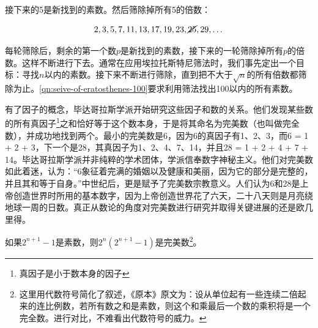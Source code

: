 \documentclass[b5paper]{ctexart}
\begin{document}
接下来的5是新找到的素数。然后筛除掉所有5的倍数：

\[2, 3, 5, 7, 11, 13, 17, 19, 23, \cancel{25}, 29, \dotsc\]

每轮筛除后，剩余的第一个数$p$是新找到的素数，接下来的一轮筛除掉所有$p$的倍数。这样不断进行下去。通常在应用埃拉托斯特尼筛法时，我们事先定出一个目标：寻找$n$以内的素数。接下来不断进行筛除，直到把不大于$\sqrt{n}$的所有倍数都筛除为止。\cref{qn:seive-of-eratosthenes-100}要求利用筛法找出100以内的所有素数。

 
有了因子的概念，毕达哥拉斯学派开始研究这些因子和数的关系。他们发现某些数的所有真因子\footnote{真因子是小于数本身的因子}之和恰好等于这个数本身，于是将其命名为完美数（也叫做完全数），并成功地找到两个。最小的完美数是6，因为6的真因子有1、2、3，而6 = 1 + 2 + 3，下一个是28，其真因子为1、2、4、7、14，并且28 = 1 + 2 + 4 + 7 + 14。毕达哥拉斯学派并非纯粹的学术团体，学派信奉数字神秘主义。他们对完美数如此着迷，认为：“6象征着完满的婚姻以及健康和美丽，因为它的部分是完整的，并且其和等于自身。”中世纪后，更是赋予了完美数宗教意义。人们认为6和28是上帝创造世界时所用的基本数字，因为上帝创造世界花了六天，二十八天则是月亮绕地球一周的日数。真正从数论的角度对完美数进行研究并取得关键进展的还是欧几里得。

\begin{theorem}[欧几里得《原本》卷九，命题36]
如果$2^{n+1}-1$是素数，则$2^n(2^{n+1}-1)$是完美数\footnote{这里用代数符号简化了叙述，《原本》原文为：设从单位起有一些连续二倍起来的连比例数，若所有数之和是素数，则这个和乘最后一个数的乘积将是一个完全数。进行对比，不难看出代数符号的威力。}。
\end{theorem}
\end{document}
